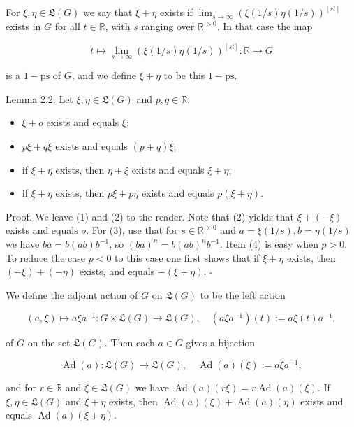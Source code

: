 \documentclass[10pt]{article}
\begin{document}
For $\xi, \eta \in \mathfrak{L}(G)$ we say that $\xi+\eta$ exists if $\lim _{s \rightarrow \infty}(\xi(1 / s) \eta(1 / s))^{[s t]}$ exists in $G$ for all $t \in \mathbb{R}$, with $s$ ranging over $\mathbb{R}^{>0}$. In that case the map

$$
t \mapsto \lim _{s \rightarrow \infty}(\xi(1 / s) \eta(1 / s))^{[s t]}: \mathbb{R} \rightarrow G
$$

is a $1-\mathrm{ps}$ of $G$, and we define $\xi+\eta$ to be this $1-\mathrm{ps}$.

Lemma 2.2. Let $\xi, \eta \in \mathfrak{L}(G)$ and $p, q \in \mathbb{R}$.

\begin{itemize}
  \item[(1)] $\xi+o$ exists and equals $\xi$;
  \item[(2)] $p \xi+q \xi$ exists and equals $(p+q) \xi$;
  \item[(3)] if $\xi+\eta$ exists, then $\eta+\xi$ exists and equals $\xi+\eta$;
  \item[(4)] if $\xi+\eta$ exists, then $p \xi+p \eta$ exists and equals $p(\xi+\eta)$.
\end{itemize}

Proof. We leave (1) and (2) to the reader. Note that (2) yields that $\xi+(-\xi)$ exists and equals $o$. For (3), use that for $s \in \mathbb{R}^{>0}$ and $a=\xi(1 / s), b=\eta(1 / s)$ we have $b a=b(a b) b^{-1}$, so $(b a)^{n}=b(a b)^{n} b^{-1}$. Item (4) is easy when $p>0$. To reduce the case $p<0$ to this case one first shows that if $\xi+\eta$ exists, then $(-\xi)+(-\eta)$ exists, and equals $-(\xi+\eta)$. \(\square\)

We define the adjoint action of $G$ on $\mathfrak{L}(G)$ to be the left action

$$
(a, \xi) \mapsto a \xi a^{-1}: G \times \mathfrak{L}(G) \rightarrow \mathfrak{L}(G), \quad\left(a \xi a^{-1}\right)(t):=a \xi(t) a^{-1},
$$

of $G$ on the set $\mathfrak{L}(G)$. Then each $a \in G$ gives a bijection

$$
\operatorname{Ad}(a): \mathfrak{L}(G) \rightarrow \mathfrak{L}(G), \quad \operatorname{Ad}(a)(\xi):=a \xi a^{-1},
$$

and for $r \in \mathbb{R}$ and $\xi \in \mathfrak{L}(G)$ we have $\operatorname{Ad}(a)(r \xi)=r \operatorname{Ad}(a)(\xi)$. If $\xi, \eta \in \mathfrak{L}(G)$ and $\xi+\eta$ exists, then $\operatorname{Ad}(a)(\xi)+\operatorname{Ad}(a)(\eta)$ exists and equals $\operatorname{Ad}(a)(\xi+\eta)$.
\end{document}
